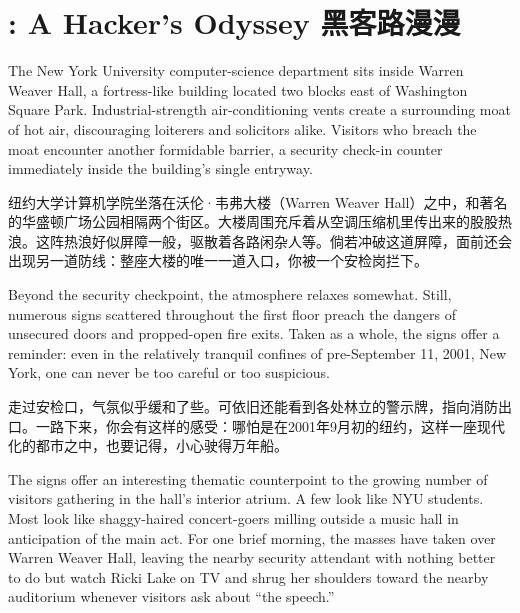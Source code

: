 \chapter{\ifdefined{}: A Hacker's Odyssey
\fi
\ifdefined\chs
黑客路漫漫
\fi}

\ifdefined\eng
The New York University computer-science department sits inside Warren Weaver Hall, a fortress-like building located two blocks east of Washington Square Park. Industrial-strength air-conditioning vents create a surrounding moat of hot air, discouraging loiterers and solicitors alike. Visitors who breach the moat encounter another formidable barrier, a security check-in counter immediately inside the building's single entryway.
\fi

\ifdefined\chs
纽约大学计算机学院坐落在沃伦·韦弗大楼（Warren Weaver Hall）之中，和著名的华盛顿广场公园相隔两个街区。大楼周围充斥着从空调压缩机里传出来的股股热浪。这阵热浪好似屏障一般，驱散着各路闲杂人等。倘若冲破这道屏障，面前还会出现另一道防线：整座大楼的唯一一道入口，你被一个安检岗拦下。
\fi

\ifdefined\eng
Beyond the security checkpoint, the atmosphere relaxes somewhat. Still, numerous signs scattered throughout the first floor preach the dangers of unsecured doors and propped-open fire exits. Taken as a whole, the signs offer a reminder: even in the relatively tranquil confines of pre-September 11, 2001, New York, one can never be too careful or too suspicious.
\fi

\ifdefined\chs
走过安检口，气氛似乎缓和了些。可依旧还能看到各处林立的警示牌，指向消防出口。一路下来，你会有这样的感受：哪怕是在2001年9月初的纽约，这样一座现代化的都市之中，也要记得，小心驶得万年船。
\fi

\ifdefined\eng
The signs offer an interesting thematic counterpoint to the growing number of visitors gathering in the hall's interior atrium. A few look like NYU students. Most look like shaggy-haired concert-goers milling outside a music hall in anticipation of the main act. For one brief morning, the masses have taken over Warren Weaver Hall, leaving the nearby security attendant with nothing better to do but watch Ricki Lake on TV and shrug her shoulders toward the nearby auditorium whenever visitors ask about ``the speech.''
\fi

